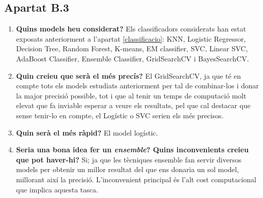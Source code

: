 \documentclass[a4paper, 11pt]{article}
\begin{document}
\subsection{Apartat B.3}
\begin{enumerate}
    \item \textbf{Quins models heu considerat?} Els classificadors considerats han estat exposats anteriorment a l'apartat \textcolor{blue}{\ref{classificacio}}: KNN, Logistic Regressor, Decision Tree, Random Forest, K-means, EM classifier, SVC, Linear SVC, AdaBoost Classifier, Ensemble Classifier, GridSearchCV i BayesSearchCV.
    \item \textbf{Quin creieu que serà el més precís?} El GridSearchCV, ja que té en compte tots els models estudiats anteriorment per tal de combinar-los i donar la major precisió possible, tot i que al tenir un temps de computació molt elevat que fa inviable esperar a veure els resultats, pel que cal destacar que sense tenir-lo en compte, el Logístic o SVC serien els més precisos. 
    \item \textbf{Quin serà el més ràpid?} El model logístic.
    
    \item \textbf{Seria una bona idea fer un \textit{ensemble}? Quins inconvenients creieu que pot haver-hi?} Si; ja que les tècniques ensemble fan servir diversos models per obtenir un millor resultat del que ens donaria un sol model, millorant així la precisió. L'inconvenient principal és l'alt cost computacional que implica aquesta tasca.
    
\end{enumerate}
\newpage
\end{document}
